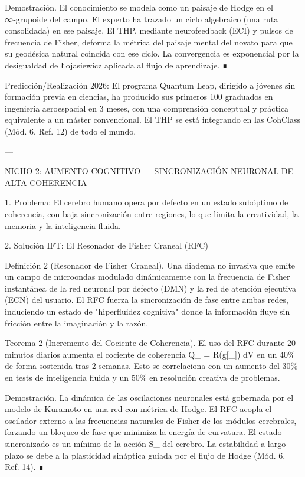 \documentclass[12pt,twoside]{book}
\begin{document}
Demostración. El conocimiento se modela como un paisaje de Hodge en el ∞‑grupoide del campo. El experto ha trazado un ciclo algebraico (una ruta consolidada) en ese paisaje. El THP, mediante neurofeedback (ECI) y pulsos de frecuencia de Fisher, deforma la métrica del paisaje mental del novato para que su geodésica natural coincida con ese ciclo. La convergencia es exponencial por la desigualdad de Łojasiewicz aplicada al flujo de aprendizaje. ∎

Predicción/Realización 2026: El programa Quantum Leap, dirigido a jóvenes sin formación previa en ciencias, ha producido sus primeros 100 graduados en ingeniería aeroespacial en 3 meses, con una comprensión conceptual y práctica equivalente a un máster convencional. El THP se está integrando en las CohClass (Mód. 6, Ref. 12) de todo el mundo.

---

NICHO 2: AUMENTO COGNITIVO — SINCRONIZACIÓN NEURONAL DE ALTA COHERENCIA

1. Problema: El cerebro humano opera por defecto en un estado subóptimo de coherencia, con baja sincronización entre regiones, lo que limita la creatividad, la memoria y la inteligencia fluida.

2. Solución IFT: El Resonador de Fisher Craneal (RFC)

Definición 2 (Resonador de Fisher Craneal). Una diadema no invasiva que emite un campo de microondas modulado dinámicamente con la frecuencia de Fisher instantánea de la red neuronal por defecto (DMN) y la red de atención ejecutiva (ECN) del usuario. El RFC fuerza la sincronización de fase entre ambas redes, induciendo un estado de "hiperfluidez cognitiva" donde la información fluye sin fricción entre la imaginación y la razón.

Teorema 2 (Incremento del Cociente de Coherencia). El uso del RFC durante 20 minutos diarios aumenta el cociente de coherencia  Q_{} = \int R(g[\rho_{}]) dV  en un 40\% de forma sostenida tras 2 semanas. Esto se correlaciona con un aumento del 30\% en tests de inteligencia fluida y un 50\% en resolución creativa de problemas.

Demostración. La dinámica de las oscilaciones neuronales está gobernada por el modelo de Kuramoto en una red con métrica de Hodge. El RFC acopla el oscilador externo a las frecuencias naturales de Fisher de los módulos cerebrales, forzando un bloqueo de fase que minimiza la energía de curvatura. El estado sincronizado es un mínimo de la acción  S_{}  del cerebro. La estabilidad a largo plazo se debe a la plasticidad sináptica guiada por el flujo de Hodge (Mód. 6, Ref. 14). ∎
\end{document}
